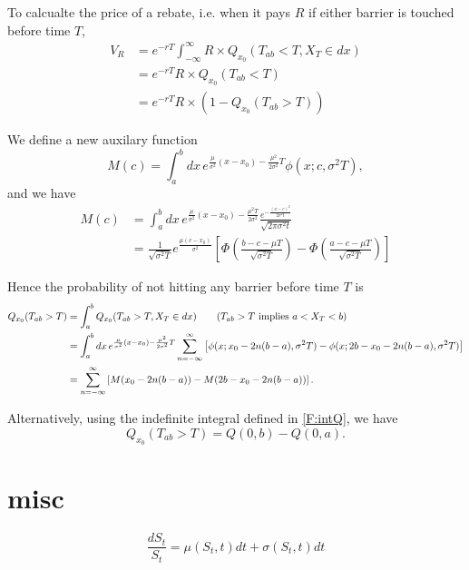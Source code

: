 To calcualte the price of a rebate, i.e. when it pays $R$ if either barrier is
touched before time $T$, 
\begin{align*}
  V_R &= e^{-rT} \int_{-\infty}^{\infty} R \times Q_{x_0}(T_{ab}<T,X_T\in dx) \\
      &= e^{-rT} R \times Q_{x_0}(T_{ab}<T) \\
      &= e^{-rT} R \times ( 1 - Q_{x_0}(T_{ab}>T)) 
\end{align*}

We define a new auxilary function
\begin{equation}
  M(c) = \int_a^b dx\, e^{\frac{\mu}{\sigma^2}(x-x_0) - \frac{\mu^2}{2 \sigma^2} T}
	 \phi(x; c,\sigma^2 T),
\end{equation}
and we have
\begin{align*}
  M(c) 
    &= \int_a^b dx\, e^{\frac{\mu}{\sigma^2}(x-x_0) - \frac{\mu^2 T}{2 \sigma^2}}
	\frac{e^{-\frac{(x-c)^2}{2\sigma^2 t}}}{\sqrt{2\pi\sigma^2 t}} \\
    &= \frac{1}{\sqrt{\sigma^2 T}} e^{\frac{\mu(c-x_0)}{\sigma^2}}
       \left[
         \Phi\left(\frac{b-c-\mu T}{\sqrt{\sigma^2 T}}\right)
         - \Phi\left(\frac{a-c-\mu T}{\sqrt{\sigma^2 T}}\right)
       \right]
\end{align*}

Hence the probability of not hitting any barrier before time $T$ is
\begin{align}
  Q_{x_0}(T_{ab}>T) 
    &= \int_a^b Q_{x_0}(T_{ab}>T, X_T\in dx) \qquad 
       \text{($T_{ab}>T$ implies $a<X_T<b$)} \notag \\
    &= \int_a^b dx\, e^{\frac{\mu}{\sigma^2}(x-x_0) - \frac{\mu^2}{2 \sigma^2} T}
       \sum_{n=-\infty}^{\infty} 
       \left[
	 \phi(x; x_0-2n(b-a),\sigma^2 T) - \phi(x; 2b-x_0-2n(b-a), \sigma^2 T)
       \right] \notag \\
    &= \sum_{n=-\infty}^{\infty} 
       \left[ M(x_0-2n (b-a)) - M(2b-x_0 -2n(b-a)) \right].
\end{align}

Alternatively, using the indefinite integral defined in \ref{F:intQ}, we have
\begin{equation}
  Q_{x_0}(T_{ab}>T) = Q(0,b) - Q(0,a).
\end{equation}

\section{misc}

\[
	\frac{dS_t}{S_t} = \mu(S_t,t) dt + \sigma(S_t,t) dt
\]

